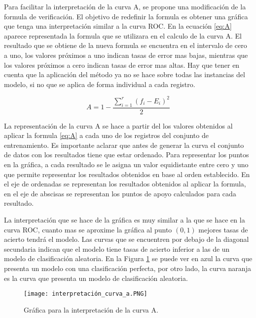 \bigbreak

Para facilitar la interpretación de la curva A, se propone una modificación de la formula de verificación. El objetivo de redefinir la formula es obtener una gráfica que tenga una interpretación similar a la curva ROC. En la ecuación \ref{eq:A} aparece representada la formula que se utilizara en el calculo de la curva A. El resultado que se obtiene de la nueva formula se encuentra en el intervalo de cero a uno, los valores próximos a uno indican tasas de error mas bajas, mientras que los valores próximos a cero indican tasas de error mas altas. Hay que tener en cuenta que la aplicación del método ya no se hace sobre todas las instancias del modelo, si no que se aplica de forma individual a cada registro.

\bigbreak

\begin{equation}
    A = 1-\frac{\sum_{i=1}^{r}{(f_{i}-E_{i})^{2}}}{2}
    \label{eq:A}
\end{equation}

\bigbreak



La representación de la curva A se hace a partir del los valores obtenidos al aplicar la formula \ref{eq:A} a cada uno de los registros del conjunto de entrenamiento. Es importante aclarar que antes de generar la curva el conjunto de datos con los resultados tiene que estar ordenado. Para representar los puntos en la gráfica, a cada resultado se le asigna un valor equidistante entre cero y uno que permite representar los resultados obtenidos en base al orden establecido. En el eje de ordenadas se representan los resultados obtenidos al aplicar la formula, en el eje de abscisas se representan los puntos de apoyo calculados para cada resultado.

\bigbreak

La interpretación que se hace de la gráfica es muy similar a la que se hace en la curva ROC, cuanto mas se aproxime la gráfica al punto $(0, 1)$ mejores tasas de acierto tendrá el modelo. Las curvas que se encuentren por debajo de la diagonal secundaria indican que el modelo tiene tasas de acierto inferior a las de un modelo de clasificación aleatoria. En la Figura \ref{fig:1} se puede ver en azul la curva que presenta un modelo con una clasificación perfecta, por otro lado, la curva naranja es la curva que presenta un modelo de clasificación aleatoria.

\bigbreak

\begin{figure}[htp]
    \centering
    \texttt{[image: interpretación\_curva\_a.PNG]}
    \caption{Gráfica para la interpretación de la curva A.}
    \label{fig:1}
\end{figure}

